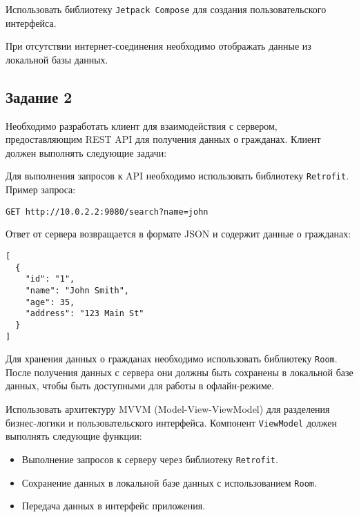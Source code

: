 \documentclass[a4paper,12pt]{article}
\begin{document}
Использовать библиотеку \texttt{Jetpack Compose} для создания пользовательского интерфейса.

При отсутствии интернет-соединения необходимо отображать данные из локальной базы данных.

\subsection*{Задание 2}

Необходимо разработать клиент для взаимодействия с сервером, предоставляющим REST API для получения данных о гражданах. Клиент должен выполнять следующие задачи:


Для выполнения запросов к API необходимо использовать библиотеку \texttt{Retrofit}. Пример запроса:

\begin{verbatim}
GET http://10.0.2.2:9080/search?name=john
\end{verbatim}

Ответ от сервера возвращается в формате JSON и содержит данные о гражданах:

\begin{verbatim}
[
  {
    "id": "1",
    "name": "John Smith",
    "age": 35,
    "address": "123 Main St"
  }
]
\end{verbatim}

Для хранения данных о гражданах необходимо использовать библиотеку \texttt{Room}. После получения данных с сервера они должны быть сохранены в локальной базе данных, чтобы быть доступными для работы в офлайн-режиме.

Использовать архитектуру MVVM (Model-View-ViewModel) для разделения бизнес-логики и пользовательского интерфейса. Компонент \texttt{ViewModel} должен выполнять следующие функции:
\begin{itemize}
    \item Выполнение запросов к серверу через библиотеку \texttt{Retrofit}.
    \item Сохранение данных в локальной базе данных с использованием \texttt{Room}.
    \item Передача данных в интерфейс приложения.
\end{itemize}
\end{document}
